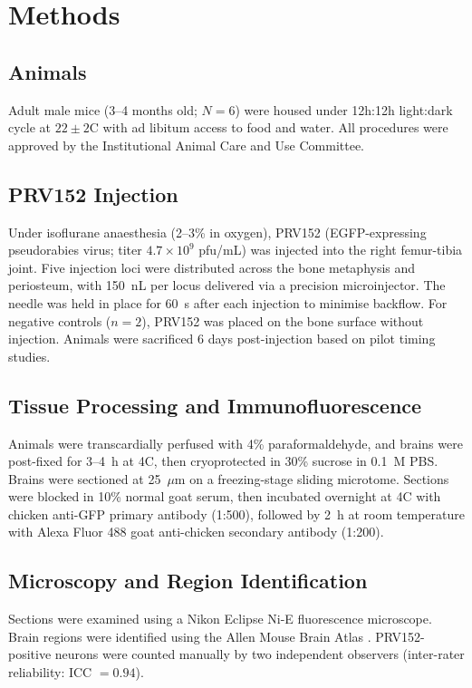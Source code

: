 \documentclass[11pt]{article}
\begin{document}
\section{Methods}

\subsection{Animals}
Adult male mice (3--4 months old; $N = 6$) were housed under 12h:12h light:dark cycle at $22 \pm 2$\textdegree C with ad libitum access to food and water. All procedures were approved by the Institutional Animal Care and Use Committee.

\subsection{PRV152 Injection}
Under isoflurane anaesthesia (2--3\% in oxygen), PRV152 (EGFP-expressing pseudorabies virus; titer $4.7 \times 10^9$ pfu/mL) was injected into the right femur-tibia joint. Five injection loci were distributed across the bone metaphysis and periosteum, with 150~nL per locus delivered via a precision microinjector. The needle was held in place for 60~s after each injection to minimise backflow. For negative controls ($n = 2$), PRV152 was placed on the bone surface without injection. Animals were sacrificed 6 days post-injection based on pilot timing studies.

\subsection{Tissue Processing and Immunofluorescence}
Animals were transcardially perfused with 4\% paraformaldehyde, and brains were post-fixed for 3--4~h at 4\textdegree C, then cryoprotected in 30\% sucrose in 0.1~M PBS. Brains were sectioned at 25~$\mu$m on a freezing-stage sliding microtome. Sections were blocked in 10\% normal goat serum, then incubated overnight at 4\textdegree C with chicken anti-GFP primary antibody (1:500), followed by 2~h at room temperature with Alexa Fluor 488 goat anti-chicken secondary antibody (1:200).

\subsection{Microscopy and Region Identification}
Sections were examined using a Nikon Eclipse Ni-E fluorescence microscope. Brain regions were identified using the Allen Mouse Brain Atlas \citep{lein2007genome, allen2004allen}. PRV152-positive neurons were counted manually by two independent observers (inter-rater reliability: ICC $= 0.94$).
\end{document}
